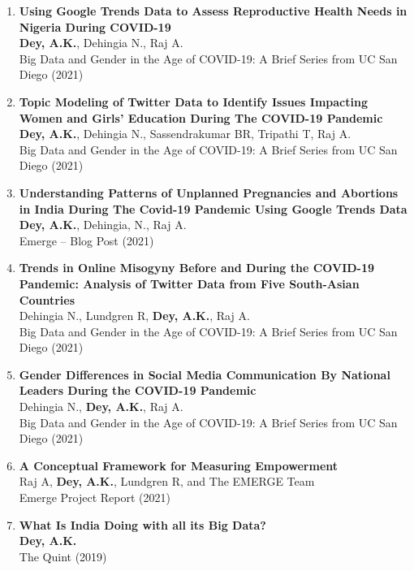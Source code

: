 \documentclass[13pt,letterpaper]{article}
\begin{document}
\begin{enumerate}
\item \textbf{Using Google Trends Data to Assess Reproductive Health Needs in Nigeria During COVID-19}\\
\textbf{Dey, A.K.}, Dehingia N., Raj A.\\
Big Data and Gender in the Age of COVID-19: A Brief Series from UC San Diego (2021) 

\item \textbf{Topic Modeling of Twitter Data to Identify Issues Impacting Women and Girls' Education During The COVID-19 Pandemic}\\
\textbf{Dey, A.K.}, Dehingia N., Sassendrakumar BR, Tripathi T, Raj A.\\
Big Data and Gender in the Age of COVID-19: A Brief Series from UC San Diego (2021) 

\item \textbf{Understanding Patterns of Unplanned Pregnancies and Abortions in India During The Covid-19 Pandemic Using Google Trends Data}\\
\textbf{Dey, A.K.}, Dehingia, N., Raj A.\\
Emerge – Blog Post (2021) 

\item \textbf{Trends in Online Misogyny Before and During the COVID-19 Pandemic: Analysis of Twitter Data from Five South-Asian Countries}\\
Dehingia N., Lundgren R, \textbf{Dey, A.K.}, Raj A.\\
Big Data and Gender in the Age of COVID-19: A Brief Series from UC San Diego (2021) 

\item \textbf{Gender Differences in Social Media Communication By National Leaders During the COVID-19 Pandemic}\\
Dehingia N., \textbf{Dey, A.K.}, Raj A.\\
Big Data and Gender in the Age of COVID-19: A Brief Series from UC San Diego (2021) 

\item \textbf{A Conceptual Framework for Measuring Empowerment}\\
Raj A, \textbf{Dey, A.K.}, Lundgren R, and The EMERGE Team\\
Emerge Project Report (2021) 

\item \textbf{What Is India Doing with all its Big Data?}\\
\textbf{Dey, A.K.}\\
The Quint (2019) 
\end{enumerate}
\end{document}
